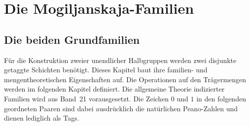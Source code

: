 \chapter{Die Mogiljanskaja-Familien}

\section{Die beiden Grundfamilien}

Für die Konstruktion zweier unendlicher Halbgruppen werden zwei
disjunkte getaggte Schichten benötigt. Dieses Kapitel baut ihre familien-
und mengentheoretischen Eigenschaften auf. Die Operationen auf den
Trägermengen werden im folgenden Kapitel definiert. Die allgemeine Theorie
indizierter Familien wird aus Band~21 vorausgesetzt.
Die Zeichen \(0\) und \(1\) in den folgenden geordneten Paaren sind dabei
ausdrücklich die natürlichen Peano-Zahlen und dienen lediglich als Tags.




\begin{tabproofsplitwide}
  \closeproofpartwide
\end{tabproofsplitwide}

